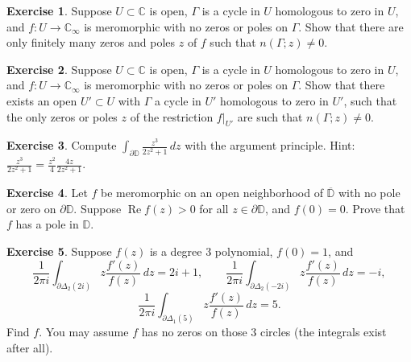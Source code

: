 \documentclass[12pt,openany]{book}
\renewcommand{\Re}{\operatorname{Re}}
\newcommand{\C}{{\mathbb{C}}}
\newcommand{\D}{{\mathbb{D}}}
\theoremstyle{plain}
\theoremstyle{remark}
\theoremstyle{definition}
\newenvironment{exbox}{%
    \def\FrameCommand{\vrule width 1pt \relax\hspace{10pt}}%
    \MakeFramed{\advance\hsize-\width\FrameRestore}%
}{%
    \endMakeFramed
}
\theoremstyle{exercise}
\newtheorem{exercise}{Exercise}[section]
\theoremstyle{example}
\begin{document}
\begin{exbox}
\begin{exercise}
Suppose $U \subset \C$ is open, $\Gamma$ is a cycle in $U$
homologous to zero in $U$,
and $f \colon U \to \C_\infty$ is meromorphic with no zeros or poles on $\Gamma$.
Show that there are only finitely many zeros and poles $z$ of $f$
such that $n(\Gamma;z) \not= 0$.
\end{exercise}

\begin{exercise}
Suppose $U \subset \C$ is open, $\Gamma$ is a cycle in $U$
homologous to zero in $U$,
and $f \colon U \to \C_\infty$ is meromorphic with
no zeros or poles on $\Gamma$.
Show that there exists an open $U' \subset U$
with $\Gamma$ a cycle in $U'$ homologous to zero in $U'$, such that
the only zeros or poles $z$ of the restriction $f|_{U'}$
are such that $n(\Gamma;z) \not= 0$.
\end{exercise}

\begin{exercise}
Compute $\int_{\partial \D} \frac{z^3}{2 z^2+1} \, dz$ with the argument
principle.  Hint: $\frac{z^3}{2 z^2+1}=\frac{z^2}{4} \frac{4z}{2z^2+1}$.
\end{exercise}

\begin{exercise}
Let $f$ be meromorphic on an open neighborhood of $\overline{\D}$
with no pole or zero on $\partial \D$.  Suppose $\Re f(z) >
0$ for all $z \in \partial \D$, and $f(0) = 0$.  Prove that $f$ has a pole
in $\D$.
\end{exercise}

\begin{exercise}
Suppose $f(z)$ is a degree 3 polynomial, $f(0)=1$, and
\begin{equation*}
\frac{1}{2\pi i}
\int_{\partial \Delta_2(2i)} z \frac{f'(z)}{f(z)} \, dz = 2i+1 ,
\qquad
\frac{1}{2\pi i}
\int_{\partial \Delta_2(-2i)} z \frac{f'(z)}{f(z)} \, dz = -i ,
\end{equation*}
\begin{equation*}
\frac{1}{2\pi i}
\int_{\partial \Delta_1(5)} z \frac{f'(z)}{f(z)} \, dz = 5 .
\end{equation*}
Find $f$.  You may assume $f$ has no zeros on those 3 circles (the
integrals exist after all).
\end{exercise}


\end{exbox}
\end{document}
